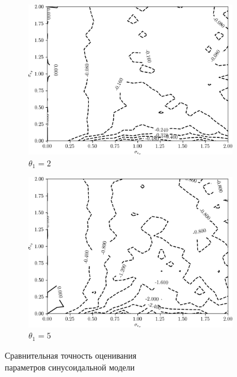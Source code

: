 

\begin{figure}[p]
  \begin{subfigure}[b]{\linewidth}
    \centering
    \includegraphics[width=135mm]{fig/nonlinear/sinusoidal/a-0_b-2.png}
    \caption{\( \theta_1 = 2 \)}
  \end{subfigure}

  \vspace{2\baselineskip}
  \begin{subfigure}[b]{\linewidth}
    \centering
    \includegraphics[width=135mm]{fig/nonlinear/sinusoidal/a-0_b-10.png}
    \caption{\( \theta_1 = 5 \)}
  \end{subfigure}

  \vspace{\baselineskip}
  \caption{
    Сравнительная точность оценивания \\
    параметров синусоидальной модели
  }\label{fig:comparison_nonlinear_sinusoidal}
\end{figure}


